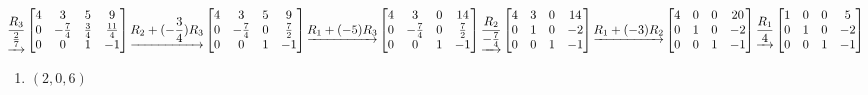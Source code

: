 \documentclass[
  11,
]{article}
\providecommand{\tightlist}{%
  \setlength{\itemsep}{0pt}\setlength{\parskip}{0pt}}
\begin{document}
\[\underrightarrow{ \frac{R_3}{\frac{2}{7}} }
\left[\begin{matrix}4 & 3 & 5 & 9\\0 & - \frac{7}{4} & \frac{3}{4} & \frac{11}{4}\\0 & 0 & 1 & -1\end{matrix}\right]
\underrightarrow{ R_2 + (- \frac{3}{4})R_3 } \\
\left[\begin{matrix}4 & 3 & 5 & 9\\0 & - \frac{7}{4} & 0 & \frac{7}{2}\\0 & 0 & 1 & -1\end{matrix}\right]
\underrightarrow{ R_1 + (-5)R_3 }
\left[\begin{matrix}4 & 3 & 0 & 14\\0 & - \frac{7}{4} & 0 & \frac{7}{2}\\0 & 0 & 1 & -1\end{matrix}\right]
\underrightarrow{ \frac{R_2}{- \frac{7}{4}} } \\
\left[\begin{matrix}4 & 3 & 0 & 14\\0 & 1 & 0 & -2\\0 & 0 & 1 & -1\end{matrix}\right]
\underrightarrow{ R_1 + (-3)R_2 }
\left[\begin{matrix}4 & 0 & 0 & 20\\0 & 1 & 0 & -2\\0 & 0 & 1 & -1\end{matrix}\right]
\underrightarrow{ \frac{R_1}{4} }
\left[\begin{matrix}1 & 0 & 0 & 5\\0 & 1 & 0 & -2\\0 & 0 & 1 & -1\end{matrix}\right]
  \]

\begin{enumerate}
\def\labelenumi{\alph{enumi})}
\setcounter{enumi}{1}
\tightlist
\item
  \((2,0,6)\)
\end{enumerate}
\end{document}
